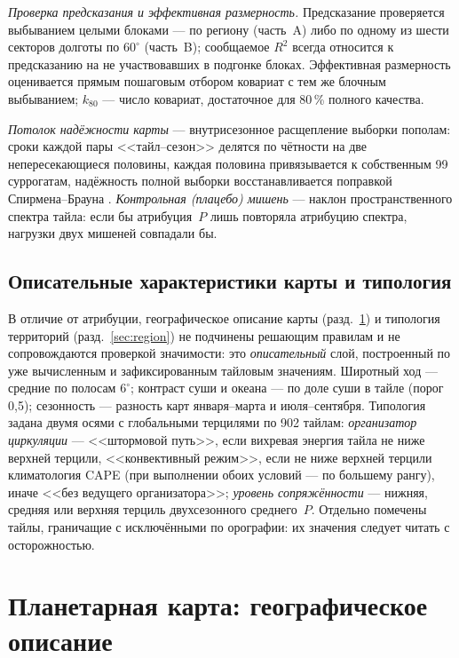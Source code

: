 \documentclass[11pt,a4paper]{article}
\begin{document}
\emph{Проверка предсказания и эффективная размерность.} Предсказание проверяется выбыванием целыми блоками --- по региону (часть~A) либо по одному из шести секторов долготы по $60^\circ$ (часть~B); сообщаемое $R^2$ всегда относится к предсказанию на не участвовавших в подгонке блоках. Эффективная размерность оценивается прямым пошаговым отбором ковариат с тем же блочным выбыванием; $k_{80}$ --- число ковариат, достаточное для 80\,\% полного качества.

\emph{Потолок надёжности карты} --- внутрисезонное расщепление выборки пополам: сроки каждой пары <<тайл--сезон>> делятся по чётности на две непересекающиеся половины, каждая половина привязывается к собственным 99 суррогатам, надёжность полной выборки восстанавливается поправкой Спирмена--Брауна \cite{Spearman1910,Brown1910}. \emph{Контрольная (плацебо) мишень} --- наклон пространственного спектра тайла: если бы атрибуция~$P$ лишь повторяла атрибуцию спектра, нагрузки двух мишеней совпадали бы.

\subsection{Описательные характеристики карты и типология}

В отличие от атрибуции, географическое описание карты (разд.~\ref{sec:geo}) и типология территорий (разд.~\ref{sec:region}) не подчинены решающим правилам и не сопровождаются проверкой значимости: это \emph{описательный} слой, построенный по уже вычисленным и зафиксированным тайловым значениям. Широтный ход --- средние по полосам $6^\circ$; контраст суши и океана --- по доле суши в тайле (порог 0,5); сезонность --- разность карт января--марта и июля--сентября. Типология задана двумя осями с глобальными терцилями по 902 тайлам: \emph{организатор циркуляции} --- <<штормовой путь>>, если вихревая энергия тайла не ниже верхней терцили, <<конвективный режим>>, если не ниже верхней терцили климатология CAPE (при выполнении обоих условий --- по большему рангу), иначе <<без ведущего организатора>>; \emph{уровень сопряжённости} --- нижняя, средняя или верхняя терциль двухсезонного среднего~$P$. Отдельно помечены тайлы, граничащие с исключёнными по орографии: их значения следует читать с осторожностью.

\section{Планетарная карта: географическое описание}
\label{sec:geo}
\end{document}
